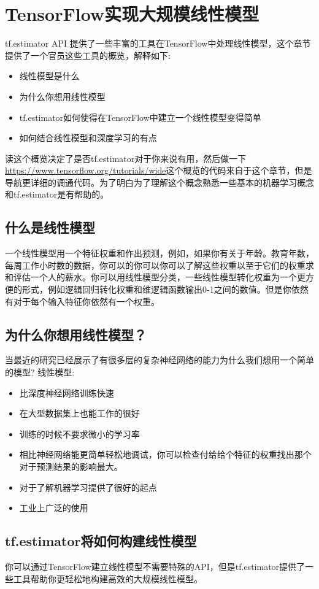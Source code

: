 \section{TensorFlow实现大规模线性模型}
tf.estimator API 提供了一些丰富的工具在TensorFlow中处理线性模型，这个章节提供了一个官员这些工具的概览，解释如下:
\begin{itemize}
  \item 线性模型是什么
  \item 为什么你想用线性模型
  \item tf.estimator如何使得在TensorFlow中建立一个线性模型变得简单
  \item 如何结合线性模型和深度学习的有点
\end{itemize}
读这个概览决定了是否tf.estimator对于你来说有用，然后做一下\href{Models tutorial}{https://www.tensorflow.org/tutorials/wide}这个概览的代码来自于这个章节，但是导航更详细的调通代码。为了明白为了理解这个概念熟悉一些基本的机器学习概念和tf.estimator是有帮助的。
\subsection{什么是线性模型}
一个线性模型用一个特征权重和作出预测，例如，如果你有关于年龄。教育年数，每周工作小时数的数据，你可以的你可以你可以了解这些权重以至于它们的权重求和评估一个人的薪水。你可以用线性模型分类，一些线性模型转化权重为一个更方便的形式，例如逻辑回归转化权重和维逻辑函数输出0-1之间的数值。但是你依然有对于每个输入特征你依然有一个权重。
\subsection{为什么你想用线性模型？}
当最近的研究已经展示了有很多层的复杂神经网络的能力为什么我们想用一个简单的模型?\newline
线性模型:
\begin{itemize}
  \item 比深度神经网络训练快速
  \item 在大型数据集上也能工作的很好
  \item 训练的时候不要求微小的学习率
  \item 相比神经网络能更简单轻松地调试，你可以检查付给给个特征的权重找出那个对于预测结果的影响最大。
  \item 对于了解机器学习提供了很好的起点
  \item 工业上广泛的使用
\end{itemize}
\subsection{tf.estimator将如何构建线性模型}
你可以通过TensorFlow建立线性模型不需要特殊的API，但是tf.estimator提供了一些工具帮助你更轻松地构建高效的大规模线性模型。
